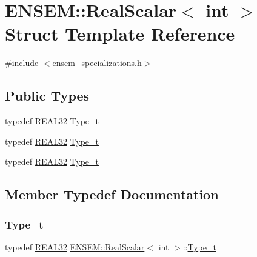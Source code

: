 \hypertarget{structENSEM_1_1RealScalar_3_01int_01_4}{}\section{E\+N\+S\+EM\+:\+:Real\+Scalar$<$ int $>$ Struct Template Reference}
\label{structENSEM_1_1RealScalar_3_01int_01_4}


{\ttfamily \#include $<$ensem\+\_\+specializations.\+h$>$}

\subsection*{Public Types}
\begin{DoxyCompactItemize}
\item 
typedef \mbox{\hyperlink{namespaceENSEM_a7540d01191172323e9073283d772576d}{R\+E\+A\+L32}} \mbox{\hyperlink{structENSEM_1_1RealScalar_3_01int_01_4_af4f2f0e6cc881e70e0564b3fe00b8ff7}{Type\+\_\+t}}
\item 
typedef \mbox{\hyperlink{namespaceENSEM_a7540d01191172323e9073283d772576d}{R\+E\+A\+L32}} \mbox{\hyperlink{structENSEM_1_1RealScalar_3_01int_01_4_af4f2f0e6cc881e70e0564b3fe00b8ff7}{Type\+\_\+t}}
\item 
typedef \mbox{\hyperlink{namespaceENSEM_a7540d01191172323e9073283d772576d}{R\+E\+A\+L32}} \mbox{\hyperlink{structENSEM_1_1RealScalar_3_01int_01_4_af4f2f0e6cc881e70e0564b3fe00b8ff7}{Type\+\_\+t}}
\end{DoxyCompactItemize}


\subsection{Member Typedef Documentation}
\mbox{\label{structENSEM_1_1RealScalar_3_01int_01_4_af4f2f0e6cc881e70e0564b3fe00b8ff7}} 
\subsubsection{\texorpdfstring{Type\_t}{Type\_t}\hspace{0.1cm}{\footnotesize\ttfamily [1/3]}}
{\footnotesize\ttfamily typedef \mbox{\hyperlink{namespaceENSEM_a7540d01191172323e9073283d772576d}{R\+E\+A\+L32}} \mbox{\hyperlink{structENSEM_1_1RealScalar}{E\+N\+S\+E\+M\+::\+Real\+Scalar}}$<$ int $>$\+::\mbox{\hyperlink{structENSEM_1_1RealScalar_3_01int_01_4_af4f2f0e6cc881e70e0564b3fe00b8ff7}{Type\+\_\+t}}}

